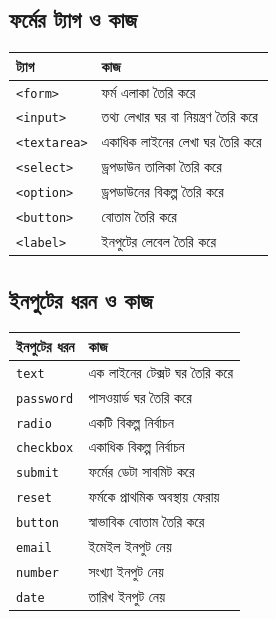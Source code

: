 \subsection{ফর্মের ট্যাগ ও কাজ}

\begin{center}
\begin{tabular}{|p{}|p{}|}
\hline
\textbf{ট্যাগ} & \textbf{কাজ} \\
\hline
\texttt{<form>} & ফর্ম এলাকা তৈরি করে \\
\hline
\texttt{<input>} & তথ্য লেখার ঘর বা নিয়ন্ত্রণ তৈরি করে \\
\hline
\texttt{<textarea>} & একাধিক লাইনের লেখা ঘর তৈরি করে \\
\hline
\texttt{<select>} & ড্রপডাউন তালিকা তৈরি করে \\
\hline
\texttt{<option>} & ড্রপডাউনের বিকল্প তৈরি করে \\
\hline
\texttt{<button>} & বোতাম তৈরি করে \\
\hline
\texttt{<label>} & ইনপুটের লেবেল তৈরি করে \\
\hline
\end{tabular}
\end{center}

\subsection{ইনপুটের ধরন ও কাজ}

\begin{center}
\begin{tabular}{|p{}|p{}|}
\hline
\textbf{ইনপুটের ধরন} & \textbf{কাজ} \\
\hline
\texttt{text} & এক লাইনের টেক্সট ঘর তৈরি করে \\
\hline
\texttt{password} & পাসওয়ার্ড ঘর তৈরি করে \\
\hline
\texttt{radio} & একটি বিকল্প নির্বাচন \\
\hline
\texttt{checkbox} & একাধিক বিকল্প নির্বাচন \\
\hline
\texttt{submit} & ফর্মের ডেটা সাবমিট করে \\
\hline
\texttt{reset} & ফর্মকে প্রাথমিক অবস্থায় ফেরায় \\
\hline
\texttt{button} & স্বাভাবিক বোতাম তৈরি করে \\
\hline
\texttt{email} & ইমেইল ইনপুট নেয় \\
\hline
\texttt{number} & সংখ্যা ইনপুট নেয় \\
\hline
\texttt{date} & তারিখ ইনপুট নেয় \\
\hline
\end{tabular}
\end{center}

